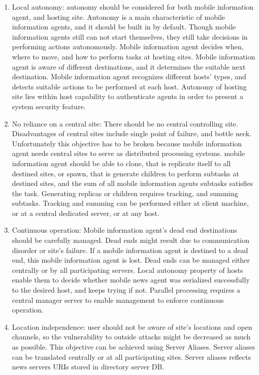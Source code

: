 \documentclass[12pt,a4paper,final,twoside,onecolumn,titlepage]{book}
\begin{document}
\begin{enumerate}
\item Local autonomy: autonomy should be considered for both mobile information agent, and hosting site. Autonomy is a main characteristic of mobile information agents, and it should be built in by default. Though mobile information agents still can not start themselves, they still take decisions in performing actions autonomously. Mobile information agent decides when, where to move, and how to perform tasks at hosting sites. Mobile information agent is aware of different destinations, and it determines the suitable next destination. Mobile information agent recognizes different hosts’ types, and detects suitable actions to be performed at each host. Autonomy of hosting site lies within host capability to authenticate agents in order to present a system security feature.
\item No reliance on a central site: There should be no central controlling site. Disadvantages of central sites include single point of failure, and bottle neck. Unfortunately this objective has to be broken because mobile information agent needs central sites to serve as distributed processing systems. mobile information agent should be able to clone, that is replicate itself to all destined sites, or spawn, that is generate children to perform subtasks at destined sites, and the sum of all mobile information  agents subtasks satisfies the task. Generating replicas or children requires tracking, and summing subtasks. Tracking and summing can be performed either at client machine, or at a central dedicated server, or at any host.
\item Continuous operation: Mobile information agent's dead end destinations should be carefully managed. Dead ends might result due to communication disorder or site's failure. If a mobile information agent is destined to a dead end, this mobile information agent is lost. Dead ends can be managed either centrally or by all participating servers. Local autonomy property of hosts enable them to decide whether mobile news agent was serialized successfully to the desired host, and keeps trying if not. Parallel processing requires a central manager server to enable management to enforce continuous operation.
\item Location independence: user should not be aware of site's locations and open channels, so the vulnerability to outside attacks might be decreased as much as possible. This objective can be achieved using Server Aliases. Server aliases can be translated centrally or at all participating sites. Server aliases reflects news servers URIs stored in directory server \gls{DB}.

\end{enumerate}
\end{document}
